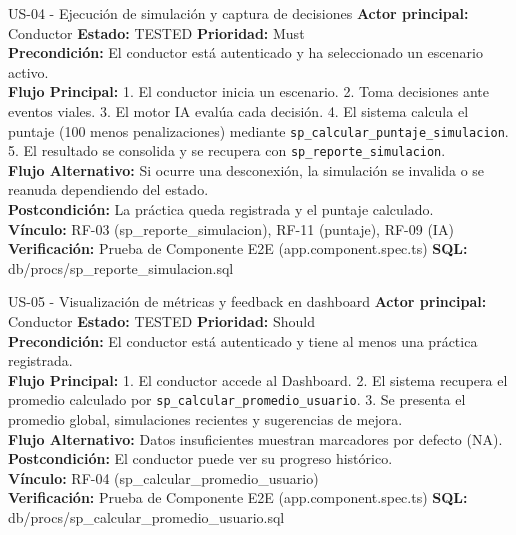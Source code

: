 \documentclass[11pt,a4paper]{article}
\begin{document}
\begin{requisito}{US-04 - Ejecución de simulación y captura de decisiones}
    \textbf{Actor principal:} Conductor \quad \textbf{Estado:} TESTED \quad \textbf{Prioridad:} Must\\[0.2cm]
    \textbf{Precondición:} El conductor está autenticado y ha seleccionado un escenario activo.\\[0.2cm]
    \textbf{Flujo Principal:} 1. El conductor inicia un escenario. 2. Toma decisiones ante eventos viales. 3. El motor IA evalúa cada decisión. 4. El sistema calcula el puntaje (100 menos penalizaciones) mediante \texttt{sp\_calcular\_puntaje\_simulacion}. 5. El resultado se consolida y se recupera con \texttt{sp\_reporte\_simulacion}. \\[0.2cm]
    \textbf{Flujo Alternativo:} Si ocurre una desconexión, la simulación se invalida o se reanuda dependiendo del estado.\\[0.2cm]
    \textbf{Postcondición:} La práctica queda registrada y el puntaje calculado. \\[0.2cm]
    \textbf{Vínculo:} RF-03 (sp\_reporte\_simulacion), RF-11 (puntaje), RF-09 (IA) \\[0.2cm]
    \textbf{Verificación:} Prueba de Componente E2E (app.component.spec.ts) \quad \textbf{SQL:} db/procs/sp\_reporte\_simulacion.sql
\end{requisito}

\begin{requisito}{US-05 - Visualización de métricas y feedback en dashboard}
    \textbf{Actor principal:} Conductor \quad \textbf{Estado:} TESTED \quad \textbf{Prioridad:} Should\\[0.2cm]
    \textbf{Precondición:} El conductor está autenticado y tiene al menos una práctica registrada.\\[0.2cm]
    \textbf{Flujo Principal:} 1. El conductor accede al Dashboard. 2. El sistema recupera el promedio calculado por \texttt{sp\_calcular\_promedio\_usuario}. 3. Se presenta el promedio global, simulaciones recientes y sugerencias de mejora. \\[0.2cm]
    \textbf{Flujo Alternativo:} Datos insuficientes muestran marcadores por defecto (NA).\\[0.2cm]
    \textbf{Postcondición:} El conductor puede ver su progreso histórico. \\[0.2cm]
    \textbf{Vínculo:} RF-04 (sp\_calcular\_promedio\_usuario) \\[0.2cm]
    \textbf{Verificación:} Prueba de Componente E2E (app.component.spec.ts) \quad \textbf{SQL:} db/procs/sp\_calcular\_promedio\_usuario.sql
\end{requisito}
\end{document}
